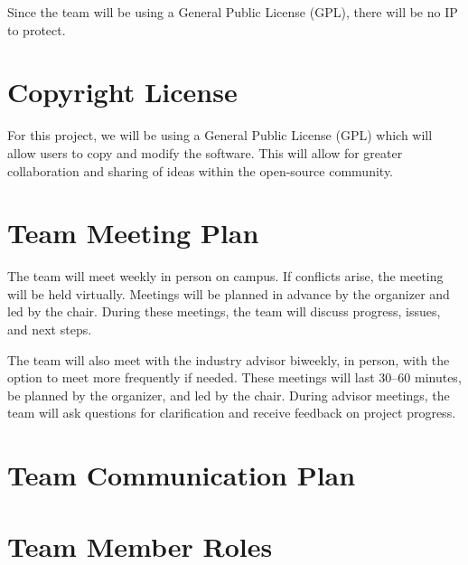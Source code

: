 \documentclass{article}
\begin{document}
Since the team will be using a General Public License (GPL), there will be no IP to protect.
\section{Copyright License}

For this project, we will be using a General Public License (GPL) which will allow users to copy and modify the software. This will allow for greater collaboration and sharing of ideas within the open-source community.

\section{Team Meeting Plan}

The team will meet weekly in person on campus. If conflicts arise, the meeting will be held virtually. Meetings will be planned in advance by the organizer and led by the chair. During these meetings, the team will discuss progress, issues, and next steps.

The team will also meet with the industry advisor biweekly, in person, with the option to meet more frequently if needed. These meetings will last 30–60 minutes, be planned by the organizer, and led by the chair. During advisor meetings, the team will ask questions for clarification and receive feedback on project progress.







\section{Team Communication Plan}


\section{Team Member Roles}
\end{document}
